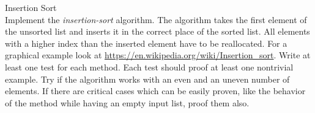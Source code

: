  Insertion Sort \\
Implement the \textit{insertion-sort} algorithm.
The algorithm takes the first element of the unsorted list and inserts it in
the correct place of the sorted list.
All elements with a higher index than the inserted element have to be
reallocated.
For a graphical example look at
\url{https://en.wikipedia.org/wiki/Insertion\_sort}.
Write at least one test for each method.
Each test should proof at least one nontrivial example.
Try if the algorithm works with an even and an uneven number of elements.
If there are critical cases which can be easily proven,
like the behavior of the method while having an empty input list,
proof them also.